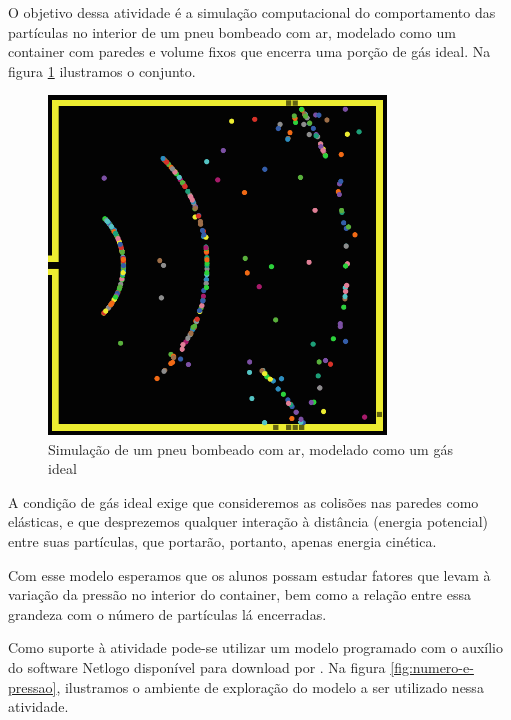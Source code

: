 O objetivo dessa atividade é a simulação computacional do comportamento das partículas no interior de um pneu bombeado com ar, modelado como um container com paredes e volume fixos que encerra uma porção de gás ideal. Na figura \ref{fig:pneu-volume} ilustramos o conjunto.

\begin{figure}[!htb]
  \caption{Simulação de um pneu bombeado com ar, modelado como um gás ideal}
  \begin{center}
    \includegraphics[width=0.8\textwidth]{imagens/pneu-volume}
  \end{center}
  \label{fig:pneu-volume}
\end{figure}

A condição de gás ideal exige que consideremos as colisões nas paredes como elásticas, e que desprezemos qualquer interação à distância (energia potencial) entre suas partículas, que portarão, portanto, apenas energia cinética.

Com esse modelo esperamos que os alunos possam estudar fatores que levam à variação da pressão no interior do container, bem como a relação entre essa grandeza com o número de partículas lá encerradas.

Como suporte à atividade pode-se utilizar um modelo programado com o auxílio do software Netlogo \cite{netlogo} disponível para download por . Na figura \ref{fig:numero-e-pressao}, ilustramos o ambiente de exploração do modelo a ser utilizado nessa atividade.

